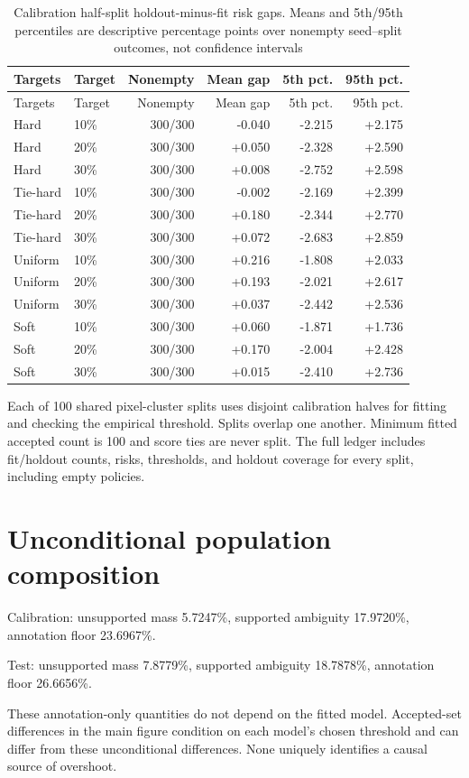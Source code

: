 \documentclass[10pt]{article}
\begin{document}
\begin{longtable}{llrrrr}
\caption{Calibration half-split holdout-minus-fit risk gaps. Means and 5th/95th percentiles are descriptive percentage points over nonempty seed--split outcomes, not confidence intervals}\\
\toprule Targets & Target & Nonempty & Mean gap & 5th pct. & 95th pct.\\\midrule\endfirsthead
\toprule Targets & Target & Nonempty & Mean gap & 5th pct. & 95th pct.\\\midrule\endhead
Hard & 10\% & 300/300 & -0.040 & -2.215 & +2.175\\
Hard & 20\% & 300/300 & +0.050 & -2.328 & +2.590\\
Hard & 30\% & 300/300 & +0.008 & -2.752 & +2.598\\
Tie-hard & 10\% & 300/300 & -0.002 & -2.169 & +2.399\\
Tie-hard & 20\% & 300/300 & +0.180 & -2.344 & +2.770\\
Tie-hard & 30\% & 300/300 & +0.072 & -2.683 & +2.859\\
Uniform & 10\% & 300/300 & +0.216 & -1.808 & +2.033\\
Uniform & 20\% & 300/300 & +0.193 & -2.021 & +2.617\\
Uniform & 30\% & 300/300 & +0.037 & -2.442 & +2.536\\
Soft & 10\% & 300/300 & +0.060 & -1.871 & +1.736\\
Soft & 20\% & 300/300 & +0.170 & -2.004 & +2.428\\
Soft & 30\% & 300/300 & +0.015 & -2.410 & +2.736\\
\bottomrule\end{longtable}
Each of 100 shared pixel-cluster splits uses disjoint calibration halves for fitting and checking the empirical threshold. Splits overlap one another. Minimum fitted accepted count is 100 and score ties are never split. The full ledger includes fit/holdout counts, risks, thresholds, and holdout coverage for every split, including empty policies.
\section*{Unconditional population composition}
Calibration: unsupported mass 5.7247\%, supported ambiguity 17.9720\%, annotation floor 23.6967\%.\par
Test: unsupported mass 7.8779\%, supported ambiguity 18.7878\%, annotation floor 26.6656\%.\par
These annotation-only quantities do not depend on the fitted model. Accepted-set differences in the main figure condition on each model's chosen threshold and can differ from these unconditional differences. None uniquely identifies a causal source of overshoot.
\end{document}
